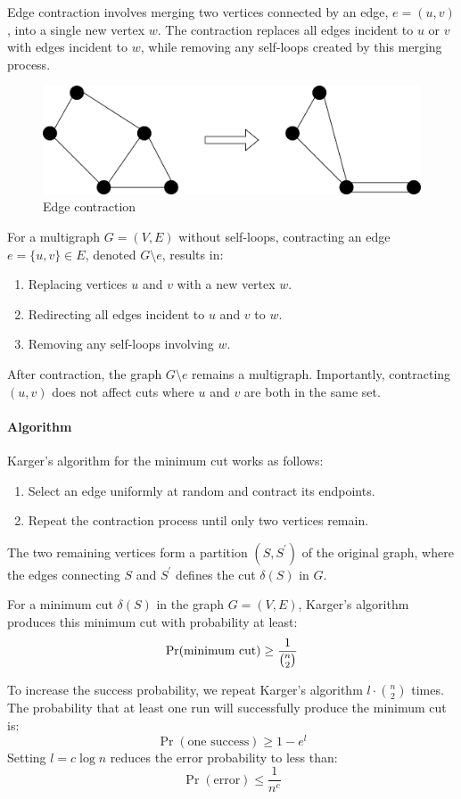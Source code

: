Edge contraction involves merging two vertices connected by an edge, $e=(u,v)$, into a single new vertex $w$. 
The contraction replaces all edges incident to $u$ or $v$ with edges incident to $w$, while removing any self-loops created by this merging process.
\begin{figure}[H]
    \centering
    \includegraphics[width=0.8\linewidth]{images/ed.png}
    \caption{Edge contraction}
\end{figure}
\begin{definition}
    For a multigraph $G=(V,E)$ without self-loops, contracting an edge $e=\{u,v\}\in E$, denoted $G\setminus e$, results in: 
\end{definition}
\begin{enumerate}
    \item Replacing vertices $u$ and $v$ with a new vertex $w$.
    \item Redirecting all edges incident to $u$ and $v$ to $w$. 
    \item Removing any self-loops involving $w$.
\end{enumerate}
After contraction, the graph $G\setminus e$ remains a multigraph.
Importantly, contracting $(u,v)$ does not affect cuts where $u$ and $v$ are both in the same set. 

\paragraph*{Algorithm}
Karger's algorithm for the minimum cut works as follows:
\begin{enumerate}
    \item Select an edge uniformly at random and contract its endpoints. 
    \item Repeat the contraction process until only two vertices remain.
\end{enumerate}
The two remaining vertices form a partition $(S, S^\prime)$ of the original graph, where the edges connecting $S$ and $S^\prime$ defines the cut $\delta(S)$ in $G$.
\begin{lemma}
    For a minimum cut $\delta(S)$ in the graph $G=(V,E)$, Karger's algorithm produces this minimum cut with probability at least:
    \[\Pr(\textnormal{minimum cut})\geq\dfrac{1}{\binom{n}{2}}\]
\end{lemma}
To increase the success probability, we repeat Karger's algorithm $l\cdot \binom{n}{2}$ times. 
The probability that at least one run will successfully produce the minimum cut is:
\[\Pr(\text{one success})\geq 1-e^l\]
Setting $l = c \log n$ reduces the error probability to less than:
\[\Pr(\text{error})\leq\dfrac{1}{n^c}\]


